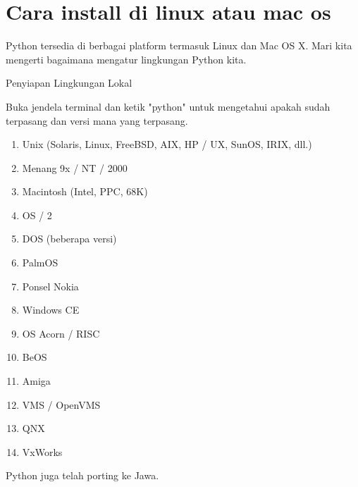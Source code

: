 \noindent 
{\fontsize{14pt}{14pt}\section {Cara install di linux atau mac os}
	
	
\vspace{14pt}
\noindent 
{\fontsize{14pt}{14pt}\selectfont Python tersedia di berbagai platform termasuk Linux dan Mac OS X. Mari kita mengerti bagaimana mengatur lingkungan Python kita. \\} \par
\vspace{14pt}
\noindent 
{\fontsize{14pt}{14pt}\selectfont Penyiapan Lingkungan Lokal \\} \par
\noindent 
{\fontsize{14pt}{14pt}\selectfont Buka jendela terminal dan ketik "python" untuk mengetahui apakah sudah terpasang dan versi mana yang terpasang. \\} \par

\begin{enumerate}
	\item Unix (Solaris, Linux, FreeBSD, AIX, HP / UX, SunOS, IRIX, dll.)
\item	Menang 9x / NT / 2000
\item	Macintosh (Intel, PPC, 68K)
\item	OS / 2
\item	DOS (beberapa versi)
\item	PalmOS
\item	Ponsel Nokia
\item	Windows CE
\item	OS Acorn / RISC
\item	BeOS
\item	Amiga
\item	VMS / OpenVMS
\item	QNX
\item	VxWorks
	
\end{enumerate}

\noindent 
{\fontsize{14pt}{14pt}\selectfont Python juga telah porting ke Jawa. \\} \par

}
